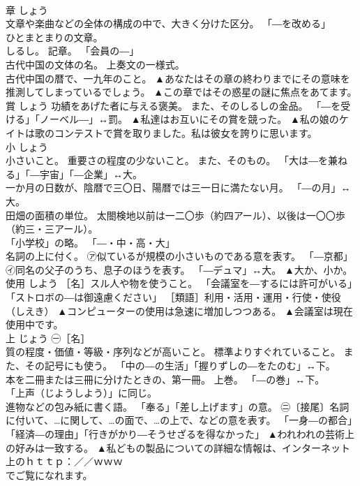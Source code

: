 \documentclass[8pt]{extreport}
\begin{document}
\begin{CJK}{UTF8}{min}
\\	章	しょう	
\\	文章や楽曲などの全体の構成の中で、大きく分けた区分。 「―を改める」 
\\	ひとまとまりの文章。 
\\	しるし。 記章。 「会員の―」 
\\	古代中国の文体の名。 上奏文の一様式。 
\\	古代中国の暦で、一九年のこと。	▲あなたはその章の終わりまでにその意味を推測してしまっているでしょう。 ▲この章ではその惑星の謎に焦点をあてます。
\\	賞	しょう	功績をあげた者に与える褒美。 また、そのしるしの金品。 「―を受ける」「ノーベル―」↔罰。	▲私達はお互いにその賞を競った。 ▲私の娘のケイトは歌のコンテストで賞を取りました。私は彼女を誇りに思います。
\\	小	しょう	
\\	小さいこと。 重要さの程度の少ないこと。 また、そのもの。 「大は―を兼ねる」「―宇宙」「―企業」↔大。 
\\	一か月の日数が、陰暦で三〇日、陽暦では三一日に満たない月。 「―の月」↔大。 
\\	田畑の面積の単位。 太閤検地以前は一二〇歩（約四アール）、以後は一〇〇歩（約三・三アール）。 
\\	「小学校」の略。 「―・中・高・大」 
\\	名詞の上に付く。 ㋐似ているが規模の小さいものである意を表す。 「―京都」 ㋑同名の父子のうち、息子のほうを表す。 「―デュマ」↔大。	▲大か、小か。
\\	使用	しよう	［名］スル人や物を使うこと。 「会議室を―するには許可がいる」「ストロボの―は御遠慮ください」 ［類語］利用・活用・運用・行使・使役（しえき）	▲コンピューターの使用は急速に増加しつつある。 ▲会議室は現在使用中です。
\\	上	じょう	㊀［名］ 
\\	質の程度・価値・等級・序列などが高いこと。 標準よりすぐれていること。 また、その記号にも使う。 「中の―の生活」「握りずしの―をたのむ」↔下。 
\\	本を二冊または三冊に分けたときの、第一冊。 上巻。 「―の巻」↔下。 
\\	「上声（じようしよう）」に同じ。 
\\	進物などの包み紙に書く語。 「奉る」「差し上げます」の意。 ㊁〔接尾〕名詞に付いて、…に関して、…の面で、…の上で、などの意を表す。 「一身―の都合」「経済―の理由」「行きがかり―そうせざるを得なかった」	▲われわれの芸術上の好みは一致する。 ▲私どもの製品についての詳細な情報は、インターネット上のｈｔｔｐ：／／ｗｗｗ
\\	でご覧になれます。

\end{CJK}
\end{document}
